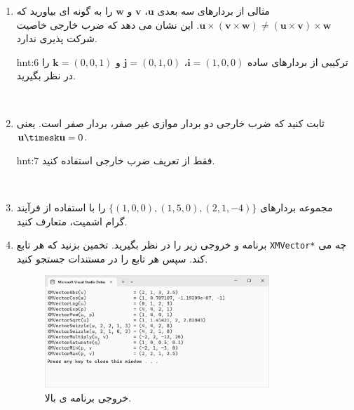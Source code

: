 {\begin{spacing}{1.5}
\begin{enumerate}
\begin{figure}[H]
                \caption {متوازی الاضلاع توسط دو بردار سه بعدی $\textbf{u}$ و $\textbf{v}$. متوازی الاضلاع دارای پایه $\norm{\textbf{v}}$ و ارتفاع $\textbf{h}$ است.}
                \label{fig:4.Session.1.1.21}
            \end{figure}
            \\
            \item {مثالی از بردارهای سه بعدی $\textbf{u}$، $\textbf{v}$ و $\textbf{w}$ را به گونه ای بیاورید که $\textbf{u}\times(\textbf{v}\times\textbf{w})\neq(\textbf{u}\times\textbf{v})\times\textbf{w}$. این نشان می دهد که ضرب خارجی خاصیت شرکت پذیری ندارد.}
            \begin{hint}{hnt:6}
                \Large
                ترکیبی از بردارهای ساده $\textbf{i}=(1,0,0)$، $\textbf{j}=(0,1,0)$ و $\textbf{k}=(0,0,1)$ را در نظر بگیرید.
            \end{hint}
            \\
            \item {ثابت کنید که ضرب خارجی دو بردار موازی غیر صفر، بردار صفر است. یعنی $\textbf{u}\timesk\textbf{u}=0$.}
            \begin{hint}{hnt:7}
                \Large
                فقط از تعریف ضرب خارجی استفاده کنید.
            \end{hint}
            \\
            \item {مجموعه بردارهای $\{(1, 0, 0), (1, 5, 0), (2, 1, -4)\}$ را با استفاده از فرآیند گرام اشمیت، متعارف کنید.}
            \\
            \item {برنامه و خروجی زیر را در نظر بگیرید.
            تخمین بزنید که هر تابع \texttt{XMVector*} چه می کند. سپس هر تابع را در مستندات  جستجو کنید.}
            \textbf{\vspace{6pt}}
            \lr{}
            \textbf{\vspace{-30pt}}
            \begin{figure}[H]
                \centering
                \setlength{\belowcaptionskip}{-10pt}
                \includegraphics[width=0.8\textwidth]{Images/4/4.Session.1.1.22}
                \caption {خروجی برنامه ی بالا.}
                \label{fig:4.Session.1.1.22}
            \end{figure}
        \end{enumerate}
    \end{spacing}
}